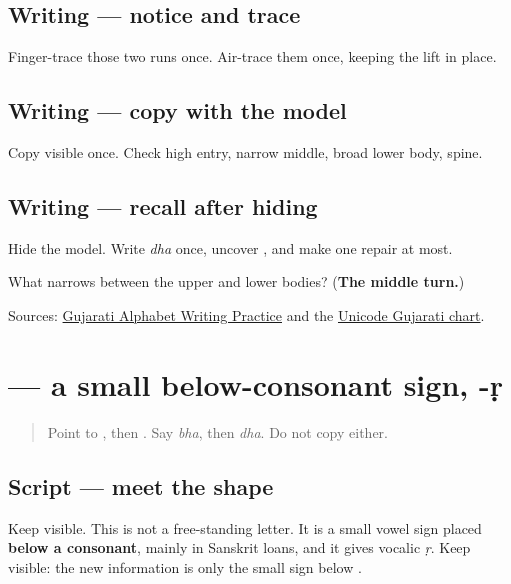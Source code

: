 \subsection*{Writing — notice and trace}

Finger-trace those two runs once. Air-trace them once, keeping the lift in place.

\subsection*{Writing — copy with the model}
Copy visible \textbf{} once. Check high entry, narrow middle, broad lower body, spine.

\subsection*{Writing — recall after hiding}
Hide the model. Write \emph{dha} once, uncover \textbf{}, and make one repair at most.

\begin{tcolorbox}[breakable,colback=teal!4,colframe=teal!35!black,title={Before you move on}]
What narrows between the upper and lower bodies? (\textbf{The middle turn.})

Sources: \href{https://www.t30apps.com/gujarati-alphabet-writing/}{Gujarati Alphabet Writing Practice} and the \href{https://www.unicode.org/charts/PDF/U0A80.pdf}{Unicode Gujarati chart}.
\end{tcolorbox}
\section[\texorpdfstring{\gu{ૃ} (-ṛ)}{ૃ (-ṛ)}]{ — a small below-consonant sign, -ṛ}

\label{lesson:GU-W02-vocalic-r}



\begin{quote}
Point to \textbf{}, then \textbf{}. Say \emph{bha}, then \emph{dha}. Do not copy either.
\end{quote}

\subsection*{Script — meet the shape}
Keep \textbf{} visible. This is not a free-standing letter. It is a small vowel sign placed \textbf{below a consonant}, mainly in Sanskrit loans, and it gives vocalic \emph{ṛ}. Keep \textbf{} visible: the new information is only the small sign below \textbf{}.

